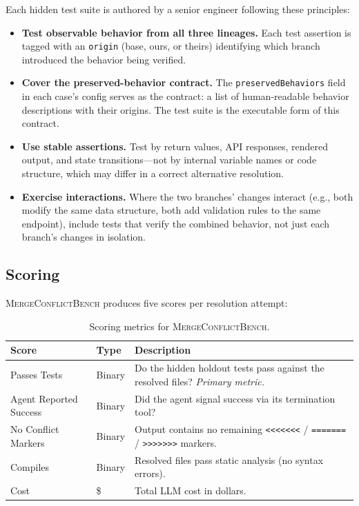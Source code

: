 \documentclass[11pt,a4paper]{article}
\begin{document}
Each hidden test suite is authored by a senior engineer following these principles:

\begin{itemize}[leftmargin=2em]
\item \textbf{Test observable behavior from all three lineages.} Each test assertion is tagged with an \texttt{origin} (base, ours, or theirs) identifying which branch introduced the behavior being verified.

\item \textbf{Cover the preserved-behavior contract.} The \texttt{preservedBehaviors} field in each case's config serves as the contract: a list of human-readable behavior descriptions with their origins. The test suite is the executable form of this contract.

\item \textbf{Use stable assertions.} Test by return values, API responses, rendered output, and state transitions---not by internal variable names or code structure, which may differ in a correct alternative resolution.

\item \textbf{Exercise interactions.} Where the two branches' changes interact (e.g., both modify the same data structure, both add validation rules to the same endpoint), include tests that verify the combined behavior, not just each branch's changes in isolation.
\end{itemize}

\subsection{Scoring}

\textsc{MergeConflictBench} produces five scores per resolution attempt:

\begin{table}[ht]
\centering
\caption{Scoring metrics for \textsc{MergeConflictBench}.}
\label{tab:scores}
\small
\begin{tabularx}{\textwidth}{llX}
\toprule
\textbf{Score} & \textbf{Type} & \textbf{Description} \\
\midrule
Passes Tests & Binary & Do the hidden holdout tests pass against the resolved files? \emph{Primary metric.} \\
Agent Reported Success & Binary & Did the agent signal success via its termination tool? \\
No Conflict Markers & Binary & Output contains no remaining \texttt{<{}<{}<{}<{}<{}<{}<} / \texttt{=======} / \texttt{>{}>{}>{}>{}>{}>{}>{}} markers. \\
Compiles & Binary & Resolved files pass static analysis (no syntax errors). \\
Cost & \$ & Total LLM cost in dollars. \\
\bottomrule
\end{tabularx}
\end{table}
\end{document}
